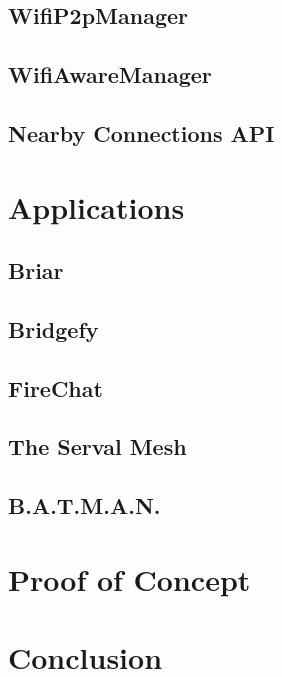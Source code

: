 \documentclass[conference,compsoc]{IEEEtran}
\begin{document}
\subsection{WifiP2pManager}
\subsection{WifiAwareManager}
\subsection{Nearby Connections API}

\section{Applications} \label{applications}
\subsection{Briar}
\subsection{Bridgefy}
\subsection{FireChat}
\subsection{The Serval Mesh}
\subsection{B.A.T.M.A.N.}

\section{Proof of Concept} \label{poc}
\section{Conclusion} \label{conclusion}



\end{document}
